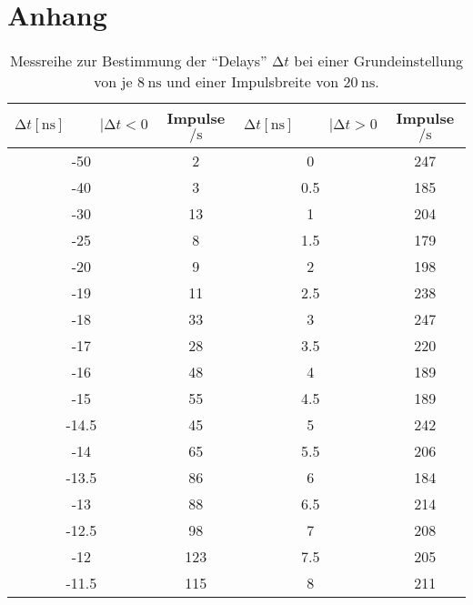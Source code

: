 \section{Anhang}

\begin{table}
    \centering
    \caption{Messreihe zur Bestimmung der \enquote{Delays} $\increment t$ bei einer Grundeinstellung von je $\SI{8}{\nano\second}$ und einer Impulsbreite von $\SI{20}{\nano\second}$. } 
    \label{tab:MessreiheDelay20ns}
    \begin{tabular}{c c || c c}
        \toprule
        $\increment t [\si{\nano\second}] \hspace{1cm}|\increment t < 0 $ & Impulse $\si{\per\second} $ & $\increment t [\si{\nano\second}] \hspace{1cm}|\increment t > 0 $ & Impulse $\si{\per\second}$ \\
        \midrule
            -50    &      2     &   0       &     247   \\               
            -40    &      3     &   0.5     &     185   \\ 
            -30    &      13    &   1       &     204   \\     
            -25    &      8     &   1.5     &     179   \\ 
            -20    &      9     &   2       &     198   \\     
            -19    &      11    &   2.5     &     238   \\  
            -18    &      33    &   3       &     247   \\     
            -17    &      28    &   3.5     &     220   \\  
            -16    &      48    &   4       &     189   \\     
            -15    &      55    &   4.5     &     189   \\     
            -14.5  &      45    &   5       &     242   \\     
            -14    &      65    &   5.5     &     206   \\  
            -13.5  &      86    &   6       &     184   \\     
            -13    &      88    &   6.5     &     214   \\  
            -12.5  &      98    &   7       &     208   \\     
            -12    &      123   &   7.5     &     205   \\   
            -11.5  &      115   &   8       &     211   \\      

\end{tabular}
\end{table}

